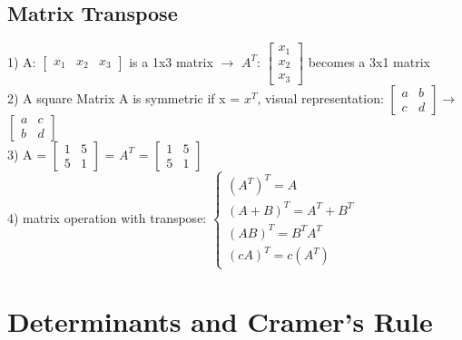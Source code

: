 \documentclass{article}
\begin{document}


\subsection{Matrix Transpose}

1) A: $\begin{bmatrix} x_1 & x_2 & x_3 \end{bmatrix}$ is a 1x3 matrix $\rightarrow$ $A^T$: $\begin{bmatrix} x_1 \\ x_2 \\ x_3 \end{bmatrix}$ becomes a 3x1 matrix \\
2) A square Matrix A is symmetric if x = $x^T$, visual representation: $\begin{bmatrix} a & b \\ c & d \end{bmatrix} \rightarrow$ $\begin{bmatrix} a & c\\ b & d \end{bmatrix}$\\
3) A = $\begin{bmatrix} 1 & 5 \\ 5 & 1 \end{bmatrix}$ = $A^T$ = $\begin{bmatrix} 1 & 5 \\ 5 & 1 \end{bmatrix}$ \\
4) matrix operation with transpose: $\begin{cases} (A^T)^T = A \\ (A+B)^T = A^T + B^T \\ (AB)^T = B^TA^T \\ (cA)^T = c(A^T) \end{cases}$


\section{Determinants and Cramer's Rule}
\end{document}
